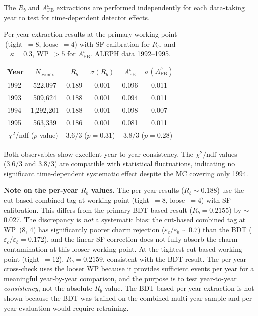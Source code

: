 \documentclass[11pt,a4paper]{article}
\begin{document}
The $R_b$ and $A_\mathrm{FB}^b$ extractions are performed independently
for each data-taking year to test for time-dependent detector effects.

\begin{table}[htbp]
\centering
\caption{Per-year extraction results at the primary working point
  (tight~$=8$, loose~$=4$) with SF calibration for $R_b$, and
  $\kappa = 0.3$, WP~$> 5$ for $A_\mathrm{FB}^b$.  ALEPH data
  1992--1995.}
\label{tbl:per-year}
\begin{tabular}{lccccc}
\toprule
Year & $N_\mathrm{events}$ & $R_b$ & $\sigma(R_b)$ & $A_\mathrm{FB}^b$ & $\sigma(A_\mathrm{FB}^b)$ \\
\midrule
1992 &   522,097 & 0.189 & 0.001 & 0.096 & 0.011 \\
1993 &   509,624 & 0.188 & 0.001 & 0.094 & 0.011 \\
1994 & 1,292,201 & 0.188 & 0.001 & 0.098 & 0.007 \\
1995 &   563,339 & 0.186 & 0.001 & 0.081 & 0.011 \\
\midrule
\multicolumn{2}{c}{$\chi^2$/ndf ($p$-value)} &
  \multicolumn{2}{c}{$3.6/3$ ($p = 0.31$)} &
  \multicolumn{2}{c}{$3.8/3$ ($p = 0.28$)} \\
\bottomrule
\end{tabular}
\end{table}

Both observables show excellent year-to-year consistency.  The
$\chi^2/\mathrm{ndf}$ values (3.6/3 and 3.8/3) are compatible with
statistical fluctuations, indicating no significant time-dependent
systematic effect despite the MC covering only 1994.

\textbf{Note on the per-year $R_b$ values.}
The per-year results ($R_b \sim 0.188$) use the cut-based combined tag
at working point (tight~$=8$, loose~$=4$) with SF calibration.  This
differs from the primary BDT-based result ($R_b = 0.2155$) by $\sim$0.027.
The discrepancy is \emph{not} a systematic bias: the cut-based combined
tag at WP~(8, 4) has significantly poorer charm rejection
($\varepsilon_c/\varepsilon_b \sim 0.7$) than the BDT
($\varepsilon_c/\varepsilon_b = 0.172$), and the linear SF correction
does not fully absorb the charm contamination at this looser working
point.  At the tightest cut-based working point (tight~$= 12$),
$R_b = 0.2159$, consistent with the BDT result.  The per-year
cross-check uses the looser WP because it provides sufficient events
per year for a meaningful year-by-year comparison, and the purpose is to
test year-to-year \emph{consistency}, not the absolute $R_b$ value.
The BDT-based per-year extraction is not shown because the BDT was
trained on the combined multi-year sample and per-year evaluation would
require retraining.
\end{document}
